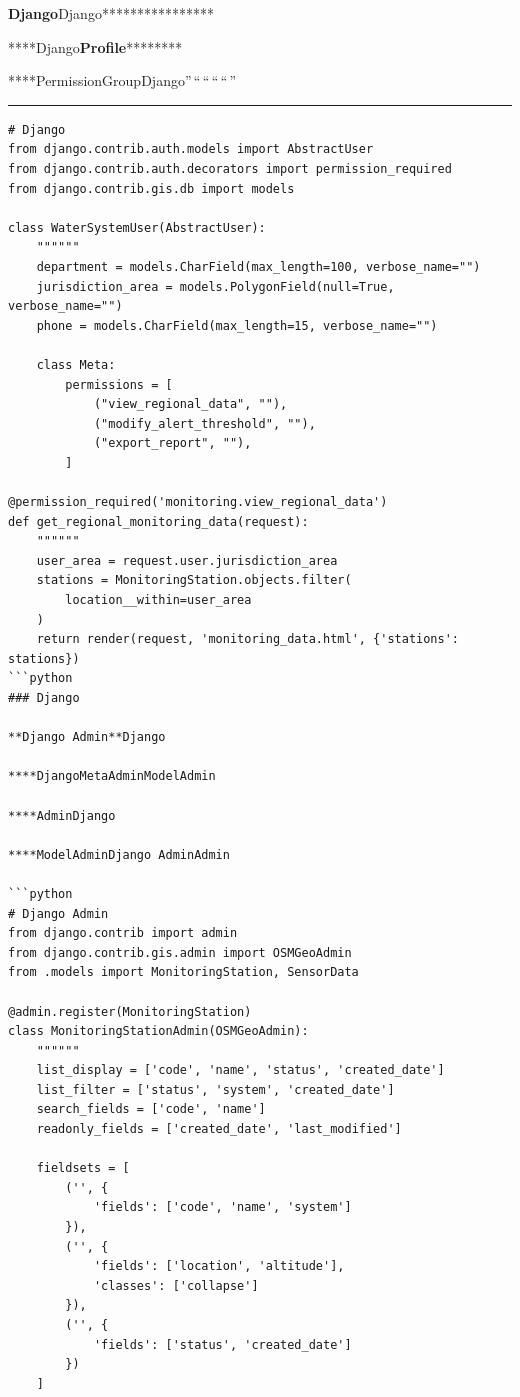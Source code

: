 \textbf{Django}Django****************

****Django\textbf{Profile}********

****PermissionGroupDjango''\,``\,``\,``\,``\,''

\begin{center}\rule{0.5\linewidth}{0.5pt}\end{center}

\begin{verbatim}
# Django
from django.contrib.auth.models import AbstractUser
from django.contrib.auth.decorators import permission_required
from django.contrib.gis.db import models

class WaterSystemUser(AbstractUser):
    """"""
    department = models.CharField(max_length=100, verbose_name="")
    jurisdiction_area = models.PolygonField(null=True, verbose_name="")
    phone = models.CharField(max_length=15, verbose_name="")
    
    class Meta:
        permissions = [
            ("view_regional_data", ""),
            ("modify_alert_threshold", ""),
            ("export_report", ""),
        ]

@permission_required('monitoring.view_regional_data')
def get_regional_monitoring_data(request):
    """"""
    user_area = request.user.jurisdiction_area
    stations = MonitoringStation.objects.filter(
        location__within=user_area
    )
    return render(request, 'monitoring_data.html', {'stations': stations})
```python
### Django

**Django Admin**Django

****DjangoMetaAdminModelAdmin

****AdminDjango

****ModelAdminDjango AdminAdmin

```python
# Django Admin
from django.contrib import admin
from django.contrib.gis.admin import OSMGeoAdmin
from .models import MonitoringStation, SensorData

@admin.register(MonitoringStation)
class MonitoringStationAdmin(OSMGeoAdmin):
    """"""
    list_display = ['code', 'name', 'status', 'created_date']
    list_filter = ['status', 'system', 'created_date']
    search_fields = ['code', 'name']
    readonly_fields = ['created_date', 'last_modified']
    
    fieldsets = [
        ('', {
            'fields': ['code', 'name', 'system']
        }),
        ('', {
            'fields': ['location', 'altitude'],
            'classes': ['collapse']
        }),
        ('', {
            'fields': ['status', 'created_date']
        })
    ]
    

\end{verbatim}
